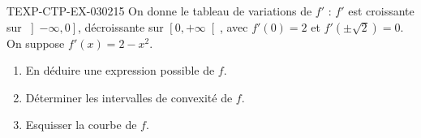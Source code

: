 \begin{exercice}{TEXP-CTP-EX-030}{2}{15}
On donne le tableau de variations de $f'$ : $f'$ est croissante sur $\left]-\infty, 0\right]$, décroissante sur $\left[0, +\infty\right[$, avec $f'(0) = 2$ et $f'(\pm\sqrt{2}) = 0$. On suppose $f'(x) = 2 - x^2$.
\begin{enumerate}
  \item En déduire une expression possible de $f$.
  \item Déterminer les intervalles de convexité de $f$.
  \item Esquisser la courbe de $f$.
\end{enumerate}

\end{exercice}
